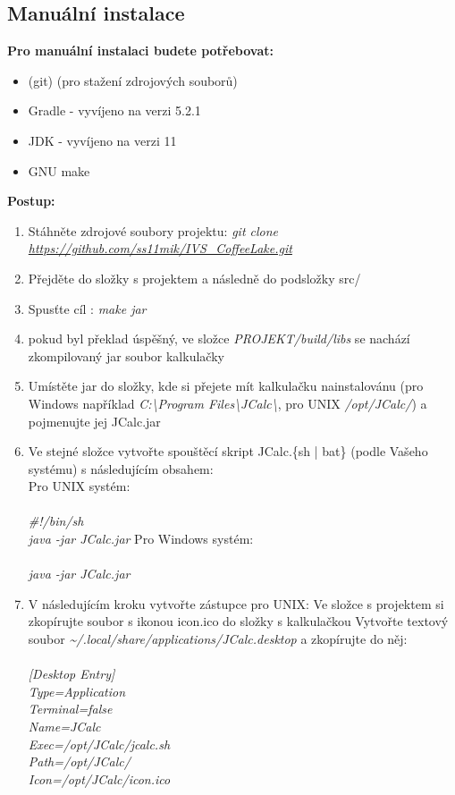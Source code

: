 \documentclass[a4paper, 11pt]{article}
\begin{document}
\subsection{Manuální instalace}

\textbf{Pro manuální instalaci budete potřebovat:}

\begin{itemize}
	\item (git) (pro stažení zdrojových souborů)
	\item Gradle - vyvíjeno na verzi 5.2.1
	\item JDK - vyvíjeno na verzi 11
	\item GNU make
\end{itemize}

\noindent
\textbf{Postup:}

\begin{enumerate}
	\item Stáhněte zdrojové soubory projektu: \emph{git clone \url{https://github.com/ss11mik/IVS_CoffeeLake.git}}
	\item Přejděte do složky s projektem a následně do podsložky src/
	\item Spusťte cíl : \emph{make jar}
	\item pokud byl překlad úspěšný, ve složce \emph{PROJEKT/build/libs} se nachází zkompilovaný jar soubor kalkulačky
	\item Umístěte jar do složky, kde si přejete mít kalkulačku nainstalovánu (pro Windows například \emph{C:\textbackslash Program Files\textbackslash JCalc\textbackslash}, pro UNIX \emph{/opt/JCalc/}) a pojmenujte jej JCalc.jar
	\item Ve stejné složce vytvořte spouštěcí skript JCalc.\{sh | bat\} (podle Vašeho systému) s následujícím obsahem:\\
		\subitem Pro UNIX systém:\\\\
			\emph{\#!/bin/sh\\
				java -jar JCalc.jar}
		\subitem Pro Windows systém:\\\\
			\emph{java -jar JCalc.jar}

	\item V následujícím kroku vytvořte zástupce
		\subitem pro UNIX:
		    \subsubitem Ve složce s projektem si zkopírujte soubor s ikonou icon.ico do složky s kalkulačkou
			\subsubitem Vytvořte textový soubor \emph{\textasciitilde/.local/share/applications/JCalc.desktop} a zkopírujte do něj:\\\\
						\emph{
						[Desktop Entry]\\
						Type=Application\\
						Terminal=false\\
						Name=JCalc\\
						Exec=/opt/JCalc/jcalc.sh\\
						Path=/opt/JCalc/\\
						Icon=/opt/JCalc/icon.ico\\
						}


\end{enumerate}
\end{document}
